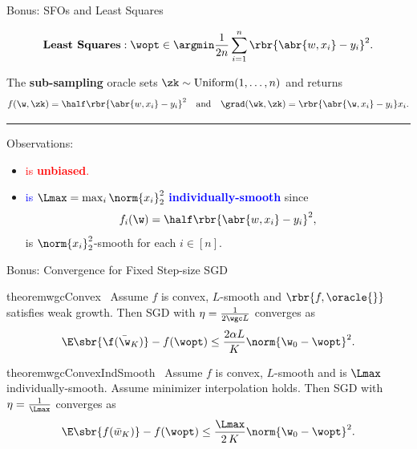 \documentclass[mathserif,notheorems, hyperref={colorlinks, citecolor=blue, urlcolor=blue, linkcolor=blue}]{beamer}
\begin{document}
        \begin{frame}{Bonus: SFOs and Least Squares}
        \vspace{-1ex}

        \[ \textbf{Least Squares}: \wopt \in \argmin \frac{1}{2n} \sum_{i=1}^n \rbr{\abr{w, x_i} - y_i}^2. \]
        
        \vspace{2ex} 
        
        The \textbf{sub-sampling} oracle sets \( \zk \sim \text{Uniform}(1, \ldots, n) \) and returns 
        \[ f(\w, \zk) =  \half \rbr{\abr{w, x_i} - y_i}^2 \quad \text{and} \quad \grad(\wk, \zk) = \rbr{\abr{\w, x_i} - y_i} x_i. \]

        \pause 
        \rule{\textwidth}{0.4pt}
        Observations: 
        \begin{itemize}
            \item \textcolor{red}{\oracle{} is \textbf{unbiased}.} 
            \item \textcolor{blue}{\oracle{} is \( \Lmax = \max_{i} \norm{x_i}^2_2 \) \textbf{individually-smooth}} since 
                    \[ f_{i}(\w) = \half \rbr{\abr{w, x_{i}} - y_{i}}^2, \]
                    is \( \norm{x_{i}}_2^2 \)-smooth for each \( i \in [n] \).
        \end{itemize}

    \end{frame}


    \begin{frame}{Bonus: Convergence for Fixed Step-size SGD}
        \begin{restatable}{theorem}{wgcConvex}~\label{thm:wgc-convex}
            Assume \( f \) is convex, \( L \)-smooth and \( \rbr{f, \oracle{}} \) satisfies weak growth. 
            Then SGD with \( \eta = \frac{1}{2 \wgc L} \) converges as
            \[ \E\sbr{\f(\bar \w_K)} - f(\wopt) \leq \frac{2 \alpha L}{K} \norm{\w_0 - \wopt}^2. \]
        \end{restatable}

        \begin{restatable}{theorem}{wgcConvexIndSmooth}~\label{thm:wgc-convex-ind-smooth}
            Assume \( f \) is convex, \( L \)-smooth and \oracle{} is \( \Lmax \) individually-smooth. 
            Assume minimizer interpolation holds. 
            Then SGD with \( \eta = \frac{1}{\Lmax} \) converges as
            \[ \E\sbr{f(\bar w_K)} - f(\wopt) \leq \frac{\Lmax}{2 \, K} \norm{\w_0 - \wopt}^2.   \]
        \end{restatable}
    \end{frame}
\end{document}
